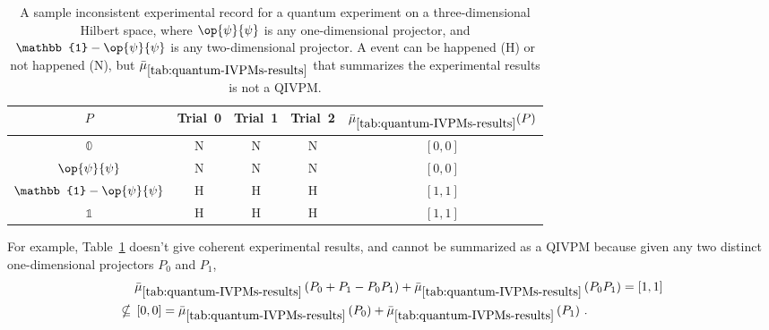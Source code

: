 \documentclass[english,reprint, aps, prl,superscriptaddress, showpacs,
showkeys, longbibliography, amsmath, amssymb, floatfix]{revtex4-1}
\theoremstyle{plain}
\theoremstyle{definition}
\newcommand{\imposs}{\ensuremath{\left[0,0\right]}}
\newcommand{\necess}{\ensuremath{\left[1,1\right]}}
\newcommand{\proj}[1]{\op{#1}{#1}}
\newcommand{\happen}{\text{H}}
\newcommand{\notHappen}{\text{N}}
\begin{document}
\begin{table}
\noindent \centering{}\caption{\label{tab:quantum-IVPMs-results}A sample inconsistent experimental
record for a quantum experiment on a three-dimensional Hilbert space,
where $\proj{\psi}$ is any one-dimensional projector, and $\mathbb{1}-\proj{\psi}$
is any two-dimensional projector. A event can be happened ($\happen$)
or not happened ($\notHappen$), but $\bar{\mu}_{\ref{tab:quantum-IVPMs-results}}$
that summarizes the experimental results is not a QIVPM.}
\begin{tabular}{ccccc}
\toprule 
\addlinespace
$P$  & Trial~0 & Trial~1 & Trial~2 & $\bar{\mu}_{\ref{tab:quantum-IVPMs-results}}(P)$\tabularnewline
\midrule
\midrule 
\addlinespace
$\mathbb{0}$  & $\notHappen$ & $\notHappen$ & $\notHappen$ & $\imposs$\tabularnewline
\midrule 
\addlinespace
$\proj{\psi}$  & $\notHappen$ & $\notHappen$ & $\notHappen$ & $\imposs$\tabularnewline
\midrule 
\addlinespace
$\mathbb{1}-\proj{\psi}$  & $\happen$ & $\happen$ & $\happen$ & $\necess$\tabularnewline
\midrule 
\addlinespace
$\mathbb{1}$  & $\happen$ & $\happen$ & $\happen$ & $\necess$\tabularnewline
\bottomrule
\end{tabular}
\end{table}
For example, Table~\ref{tab:quantum-IVPMs-results} doesn't give
coherent experimental results, and cannot be summarized as a QIVPM
because given any two distinct one-dimensional projectors $P_{0}$
and $P_{1}$, 
\begin{equation}
\begin{aligned} & \bar{\mu}_{\ref{tab:quantum-IVPMs-results}}\left(P_{0}+P_{1}-P_{0}P_{1}\right)+\bar{\mu}_{\ref{tab:quantum-IVPMs-results}}\left(P_{0}P_{1}\right)=\necess\\
\nsubseteq{} & \imposs=\bar{\mu}_{\ref{tab:quantum-IVPMs-results}}\left(P_{0}\right)+\bar{\mu}_{\ref{tab:quantum-IVPMs-results}}\left(P_{1}\right)\,.
\end{aligned}
\end{equation}
\end{document}
